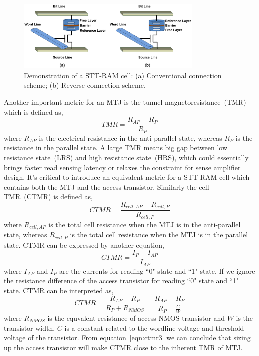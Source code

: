 \begin{figure}[t]
  \centering
  \includegraphics[width=3.5in]{fig/sttramcell.eps}
  \caption{Demonstration of a STT-RAM cell: (a) Conventional connection scheme; (b) Reverse connection scheme.}
  \label{fig:sttcell}
\end{figure}

Another important metric for an MTJ is the tunnel magnetoresistance~(TMR) which is defined as,
\begin{equation}
TMR = \frac{R_{AP}-R_{P}}{R_{P}}
\label{eqn:tmr}
\end{equation}
where ${R_{AP}}$ is the electrical resistance in the anti-parallel state, whereas ${R_{P}}$ is the resistance in the parallel state. A large TMR means big gap between low resistance state~(LRS) and high resistance state~(HRS), which could essentially brings faster read sensing latency or relaxes the constraint for sense amplifier design. It's critical to introduce an equivalent metric for a STT-RAM cell which contains both the MTJ and the access transistor. Similarly the cell TMR~(CTMR) is defined as,
\begin{equation}
CTMR = \frac{R_{cell,AP}-R_{cell,P}}{R_{cell,P}}
\label{eqn:ctmr}
\end{equation}
where $R_{cell,AP}$ is the total cell resistance when the MTJ is in the anti-parallel state, whereas $R_{cell,P}$ is the total cell resistance when the MTJ is in the parallel state. CTMR can be expressed by another equation,
\begin{equation}
CTMR = \frac{I_{P}-I_{AP}}{I_{AP}}
\label{eqn:ctmr2}
\end{equation}
where ${I_{AP}}$ and ${I_{P}}$ are the currents for reading ``0" state and ``1" state. If we ignore the resistance difference of the access transistor for reading ``0" state and ``1" state. CTMR can be interpreted as,
\begin{equation}
CTMR = \frac{R_{AP}-R_{P}}{R_{P}+R_{NMOS}} = \frac{R_{AP}-R_{P}}{R_{P}+\frac{C}{W}}
\label{eqn:ctmr3}
\end{equation}
where $R_{NMOS}$ is the equvalent resistance of access NMOS transistor and $W$ is the transistor width, $C$ is a constant related to the wordline voltage and threshold voltage of the transistor. From equation~\ref{eqn:ctmr3} we can conclude that sizing up the access transistor will make CTMR close to the inherent TMR of MTJ.

